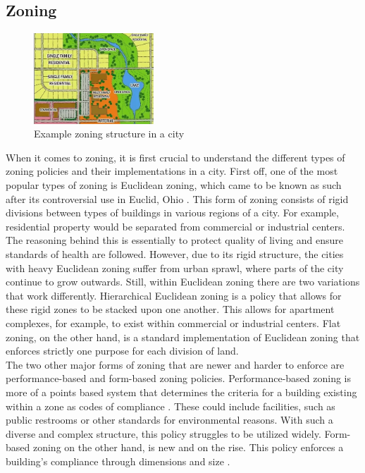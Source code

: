 \documentclass[11pt]{article}
\begin{document}
\begin{multicols}{2}
    \subsection{Zoning} \label{zoning}
    
    \begin{figure}[H]
        \centering
        \includegraphics[width=0.4\textwidth]{images/zoning.png}
        \caption{Example zoning structure in a city \cite{zoningdiagram}}
        \label{fig:zoningdiagram}
    \end{figure}
    
    \quad When it comes to zoning, it is first crucial to understand the different types of zoning policies and their implementations in a city. First off, one of the most popular types of zoning is Euclidean zoning, which came to be known as such after its controversial use in Euclid, Ohio \cite{zoning}. This form of zoning consists of rigid divisions between types of buildings in various regions of a city. For example, residential property would be separated from commercial or industrial centers. The reasoning behind this is essentially to protect quality of living and ensure standards of health are followed. However, due to its rigid structure, the cities with heavy Euclidean zoning suffer from urban sprawl, where parts of the city continue to grow outwards. Still, within Euclidean zoning there are two variations that work differently. Hierarchical Euclidean zoning is a policy that allows for these rigid zones to be stacked upon one another. This allows for apartment complexes, for example, to exist within commercial or industrial centers. Flat zoning, on the other hand, is a standard implementation of Euclidean zoning that enforces strictly one purpose for each division of land.\\
    
    \quad The two other major forms of zoning that are newer and harder to enforce are performance-based and form-based zoning policies. Performance-based zoning is more of a points based system that determines the criteria for a building existing within a zone as codes of compliance \cite{zoning}. These could include facilities, such as public restrooms or other standards for environmental reasons. With such a diverse and complex structure, this policy struggles to be utilized widely. Form-based zoning on the other hand, is new and on the rise. This policy enforces a building's compliance through dimensions and size \cite{zoning}. \\


\end{multicols}
\end{document}

